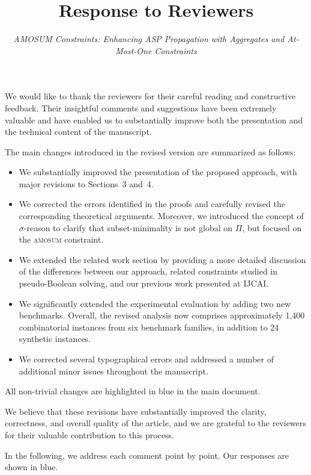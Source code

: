 \documentclass[11pt]{article}
\title{Response to Reviewers}
\author{\parbox{0.85\textwidth}{\centering\itshape AMOSUM Constraints: Enhancing ASP Propagation with Aggregates and At-Most-One Constraints}}
\date{}
\theoremstyle{definition}
\begin{document}
\maketitle

We would like to thank the reviewers for their careful reading and constructive feedback. Their insightful comments and suggestions have been extremely valuable and have enabled us to substantially improve both the presentation and the technical content of the manuscript.

The main changes introduced in the revised version are summarized as follows:
\begin{itemize}
    \item We substantially improved the presentation of the proposed approach, with major revisions to Sections~3 and~4.
    \item We corrected the errors identified in the proofs and carefully revised the corresponding theoretical arguments. Moreover, we introduced the concept of $\sigma$-reason to clarify that subset-minimality is not global on $\Pi$, but focused on the \textsc{amosum} constraint.
    \item We extended the related work section by providing a more detailed discussion of the differences between our approach, related constraints studied in pseudo-Boolean solving, and our previous work presented at IJCAI.
    \item We significantly extended the experimental evaluation by adding two new benchmarks. Overall, the revised analysis now comprises approximately 1,400 combinatorial instances from six benchmark families, in addition to 24 synthetic instances.
    \item We corrected several typographical errors and addressed a number of additional minor issues throughout the manuscript.
\end{itemize}

All non-trivial changes are highlighted in blue in the main document.

We believe that these revisions have substantially improved the clarity, correctness, and overall quality of the article, and we are grateful to the reviewers for their valuable contribution to this process.

In the following, we address each comment point by point. Our responses are shown in blue.

\end{document}
